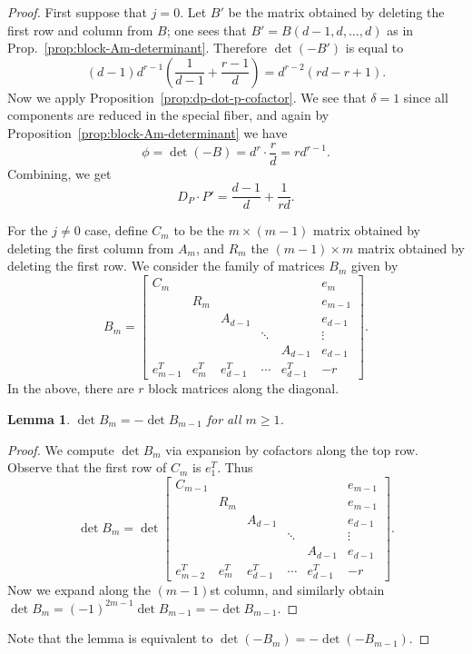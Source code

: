 \documentclass[reqno]{amsart}
\newtheorem{lemma}[thm]{Lemma}
\theoremstyle{definition}
\theoremstyle{remark}
\begin{document}
\begin{proof}
  First suppose that $j = 0$. Let $B'$ be the matrix obtained by deleting the first row and column from $B$; one sees that $B' = B(d-1, d, \dots,d)$ as in Prop.~\ref{prop:block-Am-determinant}. Therefore $\det (-B')$ is equal to
  \[
  (d-1)d^{r-1}\left(\frac{1}{d-1} + \frac{r-1}{d}\right) = d^{r-2}(rd-r+1).
  \]
  Now we apply Proposition~\ref{prop:dp-dot-p-cofactor}. We see that $\delta = 1$ since all components are reduced in the special fiber, and again by Proposition~\ref{prop:block-Am-determinant} we have
  \[
  \phi = \det (-B) = d^{r}\cdot \frac{r}{d} = rd^{r-1}.
  \]
  Combining, we get
  \[
  D_P \cdot P' = \frac{d-1}{d} + \frac{1}{rd}.
  \]

  For the $j \neq 0$ case, define $C_{m}$ to be the $m \times (m-1)$ matrix obtained by deleting the first column from $A_m$, and $R_m$ the $(m-1) \times m$ matrix obtained by deleting the first row. We consider the family of matrices $B_m$ given by
  \[
  B_m =   \left[\begin{array}{cccccc}
C_{m} & & & & & e_{m} \\
& R_m & & & & e_{m-1} \\
& & A_{d-1} & & & e_{d-1} \\
& & & \ddots & & \vdots \\
& & & & A_{d-1} & e_{d-1} \\
e_{m-1}^T & e_{m}^T & e_{d-1}^T & \cdots & e_{d-1}^T & -r
\end{array}\right].
  \]
  In the above, there are $r$ block matrices along the diagonal.

  \begin{lemma}
    $\det B_m = -\det B_{m-1}$ for all $m \geq 1$.
  \end{lemma}

  \begin{proof}
    We compute $\det B_m$ via expansion by cofactors along the top row. Observe that the first row of $C_m$ is $e_{1}^T$. Thus 
    \[
    \det B_m = \det \left[
      \begin{array}{cccccc}
        C_{m-1} & & & & & e_{m-1} \\
        & R_m & & & & e_{m-1} \\
        & & A_{d-1} & & & e_{d-1} \\
        & & & \ddots & & \vdots \\
        & & & & A_{d-1} & e_{d-1} \\
        e_{m-2}^T & e_{m}^T & e_{d-1}^T & \cdots & e_{d-1}^T & -r
      \end{array}\right].
    \]
    Now we expand along the $(m-1)$st column, and similarly obtain $\det B_m = (-1)^{2m-1}\det B_{m-1} = - \det B_{m-1}$.
  \end{proof}
  Note that the lemma is equivalent to $\det (-B_m) = - \det (-B_{m-1})$.


\end{proof}
\end{document}
